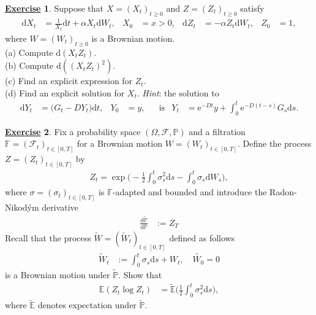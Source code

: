 \documentclass[12pt]{book}
\numberwithin{equation}{chapter}
\theoremstyle{plain}
\numberwithin{theorem}{section}
\theoremstyle{definition}
\newtheorem{exercise}{\underline{Exercise}}
\numberwithin{exercise}{chapter}
\newcommand{\<}{\langle}
\renewcommand{\>}{\rangle}
\renewcommand{\(}{\left(}
\renewcommand{\)}{\right)}
\renewcommand{\[}{\left[}
\renewcommand{\]}{\right]}
\newcommand\Eb{\mathds{E}}
\newcommand\Fb{\mathds{F}}
\newcommand\Pb{\mathds{P}}
\newcommand\Fc{\mathscr{F}}
\newcommand\Om{\Omega}
\newcommand\sig{\sigma}
\newcommand\Ebt{\widetilde{\Eb}}
\newcommand\Pbt{\widetilde{\Pb}}
\newcommand\Wt{\widetilde{W}}
\newcommand\dd{\mathrm{d}}
\newcommand\ee{\mathrm{e}}
\begin{document}
\begin{exercise}
\label{exer:8.9}
Suppose that $X = (X_t)_{t \geq 0}$ and $Z = (Z_t)_{t \geq 0}$ satisfy
\begin{align}
\dd X_t
	&=	\frac{1}{X_t} \dd t + \alpha X_t \dd W_t , &
X_0
	&=	x > 0 , &
\dd Z_t
	&=	- \alpha Z_t \dd W_t , &
Z_0
	&=	1 ,
\end{align}
where $W = (W_t)_{t \geq 0}$ is a Brownian motion.
\\[0.5em]
(a) Compute $\dd (X_t Z_t)$.
\\[0.5em]
(b) Compute $\dd ( (X_t Z_t)^2 )$.
\\[0.5em]
(c) Find an explicit expression for $Z_t$.
\\[0.5em]
(d) Find an explicit solution for $X_t$.  \textit{Hint}: the solution to 
\begin{align}
\dd Y_t
	&=	\Big(G_t - D Y_t \Big) \dd t, &
Y_0
	&=	y , &
	&\text{is}&
Y_t
	&=	\ee^{- D t} y + \int_0^t \ee^{- D(t-s)} G_s \dd s . \label{eq:exer.8.9.result}
\end{align}
\end{exercise}

\begin{exercise}
\label{exer:8.10}
Fix a probability space $(\Om, \Fc, \Pb)$ and a filtration $\Fb = (\Fc_t)_{t \in [0,T]}$ for a Brownian motion $W = (W_t)_{t \in [0,T]}$.  Define the process $Z=(Z_t)_{t\in[0,T]}$ by
\begin{align}
Z_t=\exp \Big( - \tfrac{1}{2} \int_0^t \sig_s^2 \dd s - \int_0^t \sig_s \dd W_s \Big),
\end{align}
where $\sig = (\sig_t)_{t \in [0,T]}$ is $\Fb$-adapted and bounded and introduce the Radon-Nikodým derivative
\begin{align}
\frac{\dd \Pbt}{\dd \Pb}
	&:=	Z_T
 \end{align}
Recall that the process $\Wt = (\Wt_t)_{t \in [0,T]}$ defined as follows
\begin{align}
\Wt_t
	&:=	\int_0^t \sig_s \dd s + W_t ,\quad \widetilde{W_0}= 0
\end{align}
is a Brownian motion under $\Pbt$.  Show that
\begin{align}
\Eb( Z_t \log Z_t )
	&=	\Ebt \Big( \tfrac{1}{2} \int_0^t \sig_s^2 \dd s \Big) ,
\end{align}
where $\Ebt$ denotes expectation under $\Pbt$.
\end{exercise}
\end{document}
